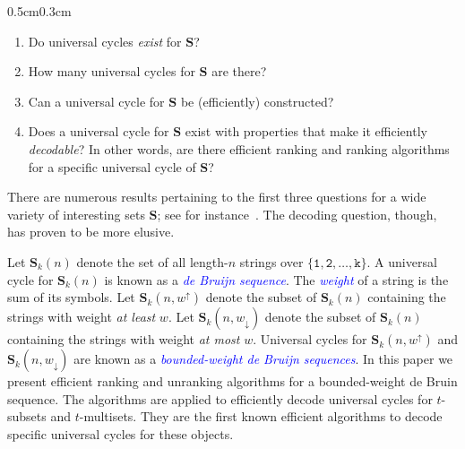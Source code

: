 \documentclass[US-letter,USenglish,authorcolumns,autoref]{lipics-v2021}
\renewcommand{\tt} {\mathtt}
\newcommand{\bS}{\mathbf{S}}
\newcommand{\defo}[1] {\emph{\textcolor{blue}{#1}}}
\begin{document}
\begin{adjustwidth}{0.5cm}{0.3cm}
\begin{enumerate}
    \item[(i)] Do universal cycles \emph{exist} for $\bS$?
    \item[(ii)] How many universal cycles for $\bS$ are there?
    \item[(iii)] Can a universal cycle for $\bS$ be  (efficiently) constructed?
    \item[(iv)] Does a universal cycle for $\bS$ exist with properties that make it efficiently \emph{decodable}? In other words, are there efficient ranking and ranking algorithms for a specific universal cycle of $\bS$?
\end{enumerate}
\end{adjustwidth}
%

\smallskip
\noindent
There are numerous results pertaining to the first three questions for a wide
variety of interesting sets $\bS$; see for instance~\cite{fred-nfsr,chung,2009research,godbole2011,etzion-book,dbseq}. The decoding question, though, has proven to be more elusive.  

Let $\bS_k(n)$ denote the set of all length-$n$ strings over $\{\tt{1,2,\ldots, k}\}$.  A universal cycle for $\bS_k(n)$ is known as a \defo{de Bruijn sequence}.  The \defo{weight} of a string is the sum of its symbols. Let $\bS_k(n,w^\uparrow)$ denote the subset of $\bS_k(n)$ containing the strings with weight \emph{at least} $w$.  Let $\bS_k(n,w_\downarrow)$ denote the subset of $\bS_k(n)$ containing the strings with weight \emph{at most} $w$.  Universal cycles for $\bS_k(n,w^\uparrow)$ and $\bS_k(n,w_\downarrow)$ are known as a \defo{bounded-weight de Bruijn sequences}. 
In this paper we present efficient ranking and unranking algorithms for a bounded-weight de Bruin sequence.  The algorithms are applied to efficiently decode universal cycles for $t$-subsets and $t$-multisets.  They are the first known efficient algorithms to decode specific universal cycles for these objects.
\end{document}
